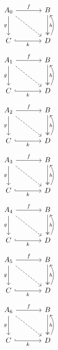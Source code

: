 \documentclass{article}
\begin{document}
\begin{equation}\begin{tikzcd}[column sep=large,row sep=large]
A_{0} \arrow[r,"f"] \arrow[d,"g"'] \arrow[dr,dashed] & B \arrow[d,two heads,"h"] \\ C \arrow[r,"k"',hook] & D \arrow[u,bend right]
\end{tikzcd}\end{equation}
\begin{equation}\begin{tikzcd}[column sep=large,row sep=large]
A_{1} \arrow[r,"f"] \arrow[d,"g"'] \arrow[dr,dashed] & B \arrow[d,two heads,"h"] \\ C \arrow[r,"k"',hook] & D \arrow[u,bend right]
\end{tikzcd}\end{equation}
\begin{equation}\begin{tikzcd}[column sep=large,row sep=large]
A_{2} \arrow[r,"f"] \arrow[d,"g"'] \arrow[dr,dashed] & B \arrow[d,two heads,"h"] \\ C \arrow[r,"k"',hook] & D \arrow[u,bend right]
\end{tikzcd}\end{equation}
\begin{equation}\begin{tikzcd}[column sep=large,row sep=large]
A_{3} \arrow[r,"f"] \arrow[d,"g"'] \arrow[dr,dashed] & B \arrow[d,two heads,"h"] \\ C \arrow[r,"k"',hook] & D \arrow[u,bend right]
\end{tikzcd}\end{equation}
\begin{equation}\begin{tikzcd}[column sep=large,row sep=large]
A_{4} \arrow[r,"f"] \arrow[d,"g"'] \arrow[dr,dashed] & B \arrow[d,two heads,"h"] \\ C \arrow[r,"k"',hook] & D \arrow[u,bend right]
\end{tikzcd}\end{equation}
\begin{equation}\begin{tikzcd}[column sep=large,row sep=large]
A_{5} \arrow[r,"f"] \arrow[d,"g"'] \arrow[dr,dashed] & B \arrow[d,two heads,"h"] \\ C \arrow[r,"k"',hook] & D \arrow[u,bend right]
\end{tikzcd}\end{equation}
\begin{equation}\begin{tikzcd}[column sep=large,row sep=large]
A_{6} \arrow[r,"f"] \arrow[d,"g"'] \arrow[dr,dashed] & B \arrow[d,two heads,"h"] \\ C \arrow[r,"k"',hook] & D \arrow[u,bend right]
\end{tikzcd}\end{equation}
\end{document}
